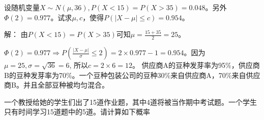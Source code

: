 \documentclass[11pt,addpoints]{exam}
\begin{document}
	
	\begin{center}
	\end{center}
	
	\newpage
	
	
	\begin{questions} %
	\question[8]
	设随机变量$X\sim N(\mu, 36), P(X < 15) = P(X > 35) = 0.048$。另外$\Phi(2) = 0.977$。试求$\mu, c$，使得$P(|X - \mu| \leq c) = 0.954$。
	
	解：
	由$P(X < 15) = P(X > 35)$可知$\mu = \frac{15 + 35}{2} = 25$。
	
	$\Phi(2) = 0.977 \Rightarrow P(\frac{|X - \mu|}{\sigma} \leq 2) = 2 \times 0.977 - 1 = 0.954$。因为$\mu = 25, \sigma = \sqrt{36} = 6$, 所以$c = 2 \times 6 = 12$。
	\question
		供应商A的豆种发芽率为95\%，供应商B的豆种发芽率为70\%。一个豆种包装公司的豆种30\%来自供应商A，70\%来自供应商B。并且全部豆种被均匀混合。
		
		\newpage
		
	 	\question
	 	一个教授给她的学生们出了15道作业题，其中4道将被当作期中考试题。一个学生只有时间学习15道题中的5道。请计算如下概率
\end{questions}
\end{document}
